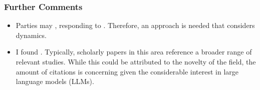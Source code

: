 \subsubsection{Further Comments}
\begin{itemize}
    \item Parties may , responding to . Therefore, an approach is needed that considers  dynamics.
    \item I found . Typically, scholarly papers in this area reference a broader range of relevant studies. While this could be attributed to the novelty of the field, the amount of citations is concerning given the considerable interest in large language models (LLMs). 
\end{itemize}
